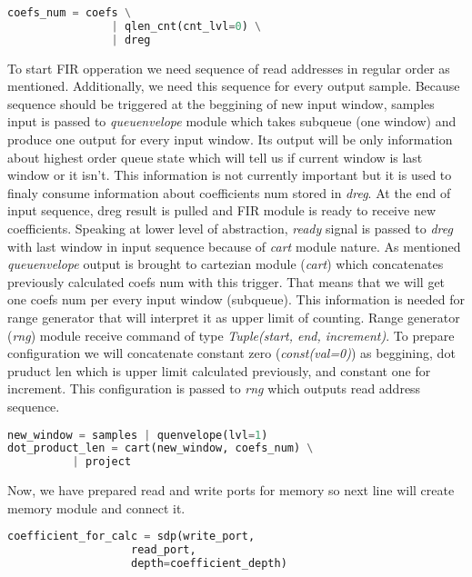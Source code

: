 \documentclass[a4paper, 12pt]{article}
\begin{document}
\begin{lstlisting}[language=Python, caption=Counting coefficients]
	coefs_num = coefs \
                | qlen_cnt(cnt_lvl=0) \
                | dreg
\end{lstlisting}

To start FIR opperation we need sequence of read addresses in regular order as mentioned. Additionally, we need this sequence for every output sample. Because sequence should be triggered at the beggining of new input window, samples input is passed to \textit{queuenvelope} module which takes subqueue (one window) and produce one output for every input window. Its output will be only information about highest order queue state which will tell us if current window is last window or it isn't. This information is not currently important but it is used to finaly consume information about coefficients num stored in \textit{dreg}. At the end of input sequence, dreg result is pulled and FIR module is ready to receive new coefficients. Speaking at lower level of abstraction, \textit{ready} signal is passed to \textit{dreg} with last window in input sequence because of \textit{cart} module nature.  As mentioned \textit{queuenvelope} output is brought to cartezian module (\textit{cart}) which concatenates previously calculated coefs num with this trigger. That means that we will get one coefs num per every input window (subqueue). This information is needed for range generator that will interpret it as upper limit of counting. Range generator (\textit{rng}) module receive command of type \textit{Tuple(start, end, increment)}. To prepare configuration we will concatenate constant zero (\textit{const(val=0)}) as beggining, dot pruduct len which is upper limit calculated previously, and constant one for increment. This configuration is passed to \textit{rng} which outputs read address sequence.

\begin{lstlisting}[language=Python, caption=Completing read port]
new_window = samples | quenvelope(lvl=1)
dot_product_len = cart(new_window, coefs_num) \
   		  | project
\end{lstlisting}

Now, we have prepared read and write ports for memory so next line will create memory module and connect it.

\begin{lstlisting}[language=Python, caption=Instance of SDP]
coefficient_for_calc = sdp(write_port, 
    			   read_port, 
    			   depth=coefficient_depth)
\end{lstlisting}
\end{document}
